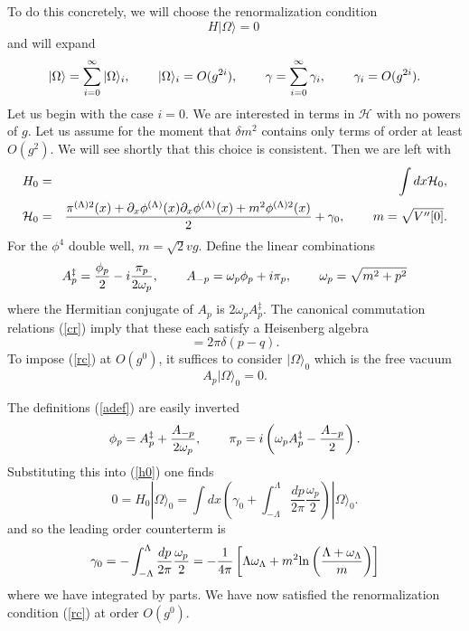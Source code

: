 \def\letter{0}\def\pr{0}\documentclass[a4paper,12pt, epsfig]{article}
\def\hsp{,\hspace{.7cm}}
\def\blu#1{\textcolor{blue}{Jarah: #1}}
\renewcommand{\(}{\begin{equation}}
\renewcommand{\)}{end{equation} \vspace{-.05in}\linebreak}
\renewcommand{\=}{\hspace{-.03in}=\hspace{-.02in}}
\renewcommand{\(}{\begin{equation}}
\renewcommand{\)}{\end{equation}}
\renewcommand{\hsp}{,\hspace{.3in}}
\renewcommand{\(}{\begin{equation}}
\renewcommand{\)}{\end{equation}}
\def\lpin#1{\int^\Lambda_{-\Lambda} \frac{d#1}{2\pi}}
\renewcommand{\L}{{(\Lambda)}}
\def\mh{\mathcal{H}}
\newcommand{\beq}{\begin{equation}}
\newcommand{\eeq}{\end{equation}}
\newcommand{\bea}{\begin{eqnarray}}
\newcommand{\eea}{\end{eqnarray}}
\begin{document}
To do this concretely, we will choose the renormalization condition 
%
\begin{equation} \label{rc}
H |\Omega \rangle = 0~
\end{equation}
and will expand
\beq
|\Omega \rangle = \sum_{i=0}^{\infty} |\Omega \rangle_i\hsp|\Omega \rangle_i = O(g^{2i})\hsp
\gamma=\sum_{i=0}^{\infty} \gamma_i\hsp
\gamma_i = O(g^{2i}). \label{gam}
\eeq
%
Let us begin with the case $i=0$.  We are interested in terms in $\mh$ with no powers of $g$.   Let us assume for the moment that $\delta m^2$ contains only terms of order at least $O(g^2)$.  We will see shortly that this choice is consistent.  Then we are left with
\bea
H_{0}&=&\int dx \mh_{0}\label{h0}, \\
\mh_{0}&=&\frac{\pi^{\L 2}(x)+\partial_x {\phi}^\L (x)\partial_x {\phi}^\L (x)+m^2\phi^{\L 2}(x)}{2}+{\gamma}_0\hsp m=\sqrt{{V}^{\prime\prime}[0]}. \nonumber
\eea
For the $\phi^4$ double well, $m=\sqrt{2}vg$.  Define the linear combinations
\beq
A^\ddag_p=\frac{\phi_p}{2}-i\frac{\pi_p}{2\omega_p}\hsp
A_{-p}=\omega_p\phi_p+i\pi_p\hsp\omega_p=\sqrt{m^2+p^2} \label{adef}
\eeq
where the Hermitian conjugate of $A_p$ is $2\omega_p A^\ddag_p$.   The canonical commutation relations (\ref{cr}) imply that these each satisfy a Heisenberg algebra
\beq
[A_p,A^\ddag_q]=2\pi\delta(p-q).
\eeq
To impose (\ref{rc}) at $O(g^0)$, it suffices to consider $ |\Omega\rangle_0$ which is the free vacuum
\beq
A_p |\Omega\rangle_0=0.
\eeq

The definitions (\ref{adef}) are easily inverted
\beq
\phi_p=A^\ddag_p+\frac{A_{-p}}{2\omega_p}\hsp
\pi_p=i\left(\omega_pA^\ddag_p-\frac{A_{-p}}{2}\right).
\eeq
Substituting this into (\ref{h0}) one finds
\beq
0=H_{0}|\Omega\rangle_0=\int dx \left(\gamma_0+\lpin{p}\frac{\omega_p}{2}\right)|\Omega\rangle_0.
\eeq
and so the leading order counterterm is
\beq
\gamma_0=-\lpin{p}\frac{\omega_p}{2}=-\frac{1}{4\pi}\left[\Lambda \omega_\Lambda+m^2 {\rm{ln}}\left(\frac{\Lambda+\omega_\Lambda}{m}
\right)\right] 
\eeq
where we have integrated by parts.  We have now satisfied the renormalization condition (\ref{rc}) at order $O(g^0)$. 

\end{document}
